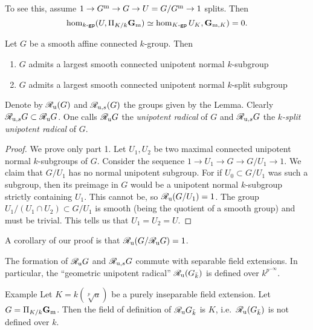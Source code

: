 To see this, assume $1 \to G^{\mathrm{m}} \to G \to U=G/G^{\mathrm{m}}\to 1$ splits. Then 
\[
  \hom_{k\textnormal{-}\mathsf{gp}}(U,\Pi_{K/k} \mathbf{G}_{\mathrm{m}}) \simeq \hom_{K\textnormal{-}\mathsf{gp}} U_K, \mathbf{G}_{\mathrm{m},K}) = 0. 
\]

\begin{lemm}
Let $G$ be a smooth affine connected $k$-group. Then 
\begin{enumerate}
  \item $G$ admits a largest smooth connected unipotent normal $k$-subgroup 
  \item $G$ admits a largest smooth connected unipotent normal $k$-split 
    subgroup 
\end{enumerate}
\end{lemm}

Denote by $\mathscr{R}_{\mathrm{u}} (G)$ and $\mathscr{R}_{\mathrm{u}, s}(G)$ the groups given by the Lemma. Clearly 
$\mathscr{R}_{\mathrm{u},s} G\subset \mathscr{R}_{\mathrm{u}}  G$. One calls $\mathscr{R}_{\mathrm{u}}  G$ the \emph{unipotent radical} of 
$G$ and $\mathscr{R}_{\mathrm{u},s} G$ the \emph{$k$-split unipotent radical} of $G$. 

\begin{proof}
We prove only part 1. Let $U_1,U_2$ be two maximal connected unipotent normal $k$-subgroups of 
$G$. Consider the sequence $1 \to U_1 \to G \to G/U_1\to 1$. We claim that 
$G/U_1$ has no normal unipotent subgroup. For if 
$U_0\subset G/U_1$ was such a subgroup, then its preimage in 
$G$ would be a unipotent normal $k$-subgroup strictly containing $U_1$. 
This cannot be, so $\mathscr{R}_{\mathrm{u}}  (G/U_1) = 1$. The group $U_1/(U_1\cap U_2)\subset G/U_1$ 
is smooth (being the quotient of a smooth group) and must be trivial. This tells 
us that $U_1=U_2=U$. 
\end{proof}

A corollary of our proof is that $\mathscr{R}_{\mathrm{u}} (G/\mathscr{R}_{\mathrm{u}}  G)=1$. 

\begin{lemm}
The formation of $\mathscr{R}_{\mathrm{u}}  G$ and $\mathscr{R}_{\mathrm{u}, s} G$ commute with separable field extensions. 
In particular, the ``geometric unipotent radical'' $\mathscr{R}_{\mathrm{u}} (G_{\bar k})$ is defined 
over $k^{p^{-\infty}}$. 
\end{lemm}

\begin{enonce}[remark]{Example}
Let $K=k(\sqrt[p] a)$ be a purely inseparable field extension. Let 
$G=\Pi_{K/k} \mathbf{G}_{\mathrm{m}}$. Then the field of definition of 
$\mathscr{R}_{\mathrm{u}}  G_{\bar k}$ is $K$, i.e.\ $\mathscr{R}_{\mathrm{u}} (G_{\bar k})$ is not 
defined over $k$. 
\end{enonce}

